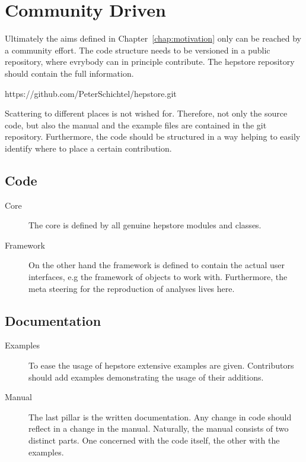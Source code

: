 \section{Community Driven}
Ultimately the aims defined in Chapter~\ref{chap:motivation} only can
be reached by a community effort. The code structure needs to be
versioned in a public repository, where evrybody can in principle
contribute. The hepstore repository should contain the full
information.
%
\begin{framed}
  \begin{center}
    https://github.com/PeterSchichtel/hepstore.git
  \end{center}
\end{framed}
%
Scattering to different places is not wished for. Therefore, not only
the source code, but also the manual and the example files are
contained in the git repository. Furthermore, the code should be
structured in a way helping to easily identify where to place a
certain contribution.

\subsection{Code}
%
\begin{description}
\item[Core] The core is defined by all genuine hepstore modules and
  classes.\\
\item[Framework] On the other hand the framework is defined to contain
  the actual user interfaces, e.g the framework of objects to work
  with. Furthermore, the meta steering for the reproduction of
  analyses lives here.
\end{description}
%

\subsection{Documentation}
%
\begin{description}
\item[Examples] To ease the usage of hepstore extensive examples are
  given. Contributors should add examples demonstrating the usage of
  their additions.\\
\item[Manual] The last pillar is the written documentation. Any change
  in code should reflect in a change in the manual. Naturally, the
  manual consists of two distinct parts. One concerned with the code
  itself, the other with the examples.
\end{description}
%
